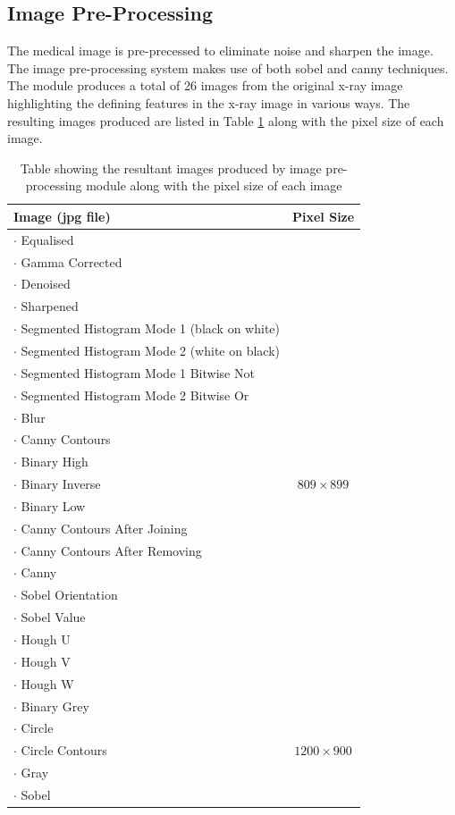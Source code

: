\documentclass[11pt,twocolumn]{witseiepaper}
\begin{document}
	\subsection{Image Pre-Processing}
	The medical image is pre-precessed to eliminate noise and sharpen the image. The image pre-processing system makes use of both sobel and canny techniques. The module produces a total of 26 images from the original x-ray image highlighting the defining features in the x-ray image in various ways. The resulting images produced are listed in Table \ref{tb: image table} along with the pixel size of each image. 
	\vspace{-3mm}
	\begin{table}[!h]
		\centering
		\caption{Table showing the resultant images produced by image pre-processing module along with the pixel size of each image}
		\label{tb: image table}
		\begin{tabular}{| p{5.5cm} | c |}
			\hline
			Image (jpg file) & Pixel Size \\
			\hline \hline
			$\cdot$ Equalised &  \\
			$\cdot$ Gamma Corrected &  \\
			$\cdot$ Denoised & \\
			$\cdot$ Sharpened & \\
			$\cdot$ Segmented Histogram Mode 1 (black on white) & \\
			$\cdot$ Segmented Histogram Mode 2 (white on black) & \\
			$\cdot$ Segmented Histogram Mode 1 Bitwise Not & \\
			$\cdot$ Segmented Histogram Mode 2 Bitwise Or & \\
			$\cdot$ Blur & \\
			$\cdot$ Canny Contours & \\
			$\cdot$ Binary High & \\
			$\cdot$ Binary Inverse & $809 \times 899$ \\
			$\cdot$ Binary Low & \\
			$\cdot$ Canny Contours After Joining & \\
			$\cdot$ Canny Contours After Removing & \\
			$\cdot$ Canny & \\
			$\cdot$ Sobel Orientation & \\
			$\cdot$ Sobel Value & \\
			$\cdot$ Hough U & \\
			$\cdot$ Hough V & \\
			$\cdot$ Hough W & \\
			\hline
			$\cdot$ Binary Grey & \\
			$\cdot$ Circle & \\
			$\cdot$ Circle Contours & $1200 \times 900$ \\
			$\cdot$ Gray & \\
			$\cdot$ Sobel & \\
			\hline
		\end{tabular}
	\end{table}
\end{document}
